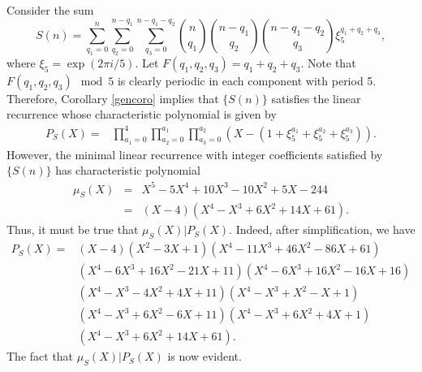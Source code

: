 \begin{example}
 Consider the sum
 \begin{equation}
  S(n)=\sum _{q_1=0}^n \sum _{q_2=0}^{n-q_1}\sum _{q_3=0}^{n-q_1-q_2} \binom{n}{q_1}\binom{n-q_1}{q_2} \binom{n-q_1-q_2}{q_3}\xi_5^{q_1+q_2+q_3},
 \end{equation}
where $\xi_5=\exp(2\pi i/5)$.  Let $F(q_1,q_2,q_3)=q_1+q_2+q_3$.  Note that $F(q_1,q_2,q_3)\mod 5$ is clearly periodic in each component with period 5.  Therefore, Corollary \ref{gencoro} implies that
$\{S(n)\}$ satisfies the linear recurrence whose characteristic polynomial is given by
\begin{align}
 P_S(X)=&\prod _{a_1=0}^4 \prod _{a_2=0}^{a_1} \prod _{a_3=0}^{a_2}\left(X-\left(1+\xi_5^{a_1}+\xi_5^{a_2}+\xi_5^{a_3}\right)\right).
\end{align}
However, the minimal linear recurrence with integer coefficients satisfied by $\{S(n)\}$ has characteristic polynomial
\begin{eqnarray}
 \mu_S(X)&=&X^5-5 X^4+10 X^3-10 X^2+5 X-244\\\nonumber
 &=&(X-4) \left(X^4-X^3+6 X^2+14 X+61\right).
\end{eqnarray}
Thus, it must be true that $\mu_S(X)|P_S(X)$. Indeed, after simplification, we have
\begin{align}
 P_S(X)=& (X-4) \left(X^2-3 X+1\right) \left(X^4-11 X^3+46 X^2-86 X+61\right)\\\nonumber
 &\left(X^4-6 X^3+16 X^2-21 X+11\right) \left(X^4-6 X^3+16 X^2-16 X+16\right)\\\nonumber
 &\left(X^4-X^3-4 X^2+4 X+11\right) \left(X^4-X^3+X^2-X+1\right)\\\nonumber
 &\left(X^4-X^3+6 X^2-6 X+11\right) \left(X^4-X^3+6 X^2+4 X+1\right)\\\nonumber
 &\left(X^4-X^3+6 X^2+14
   X+61\right).
\end{align}
The fact that $\mu_S(X)|P_S(X)$ is now evident.
\end{example}

